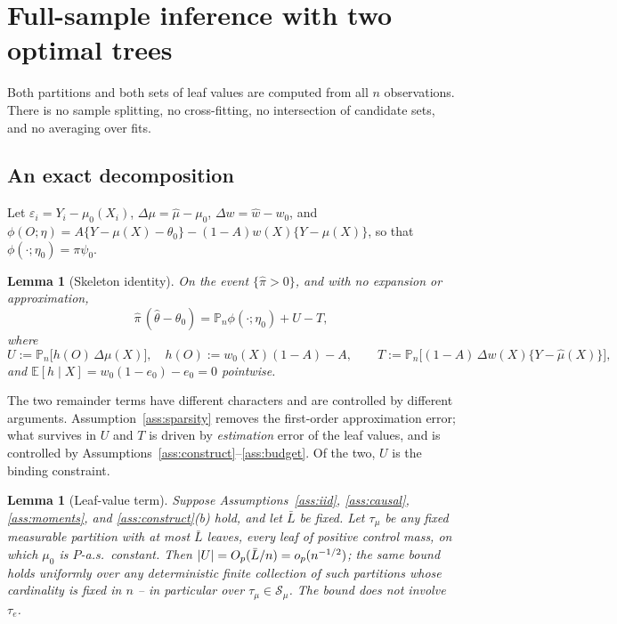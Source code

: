 \documentclass[11pt]{article}
\theoremstyle{plain}
\newtheorem{lemma}[theorem]{Lemma}
\theoremstyle{definition}
\theoremstyle{remark}
\newcommand{\E}{\mathbb{E}}
\newcommand{\Pn}{\mathbb{P}_n}
\newcommand{\cS}{\mathcal{S}}
\newcommand{\ez}{e_0}
\newcommand{\mz}{\mu_0}
\newcommand{\wz}{w_0}
\newcommand{\mhat}{\widehat{\mu}}
\newcommand{\what}{\widehat{w}}
\newcommand{\thetahat}{\widehat{\theta}}
\newcommand{\pihat}{\widehat{\pi}}
\DeclarePairedDelimiter{\abs}{\lvert}{\rvert}
\begin{document}
\section{Full-sample inference with two optimal trees}\label{sec:main}

Both partitions and both sets of leaf values are computed from all $n$
observations. There is no sample splitting, no cross-fitting, no intersection of
candidate sets, and no averaging over fits.

\subsection{An exact decomposition}

Let $\varepsilon_i=Y_i-\mz(X_i)$, $\Delta\mu=\mhat-\mz$, $\Delta w=\what-\wz$,
and $\phi(O;\eta)=A\{Y-\mu(X)-\theta_0\}-(1-A)w(X)\{Y-\mu(X)\}$, so that
$\phi(\cdot;\eta_0)=\pi\psi_0$.

\begin{lemma}[Skeleton identity]\label{lem:skeleton}
On the event $\{\pihat>0\}$, and with no expansion or approximation,
\begin{equation}\label{eq:skeleton}
  \pihat\,(\thetahat-\theta_0)=\Pn\phi(\cdot;\eta_0)+U-T,
\end{equation}
where
\[
  U:=\Pn\bigl[h(O)\,\Delta\mu(X)\bigr],\quad
  h(O):=\wz(X)(1-A)-A,
  \qquad
  T:=\Pn\bigl[(1-A)\,\Delta w(X)\{Y-\mhat(X)\}\bigr],
\]
and $\E[h\mid X]=\wz(1-\ez)-\ez=0$ pointwise.
\end{lemma}

The two remainder terms have different characters and are controlled by
different arguments. Assumption~\ref{ass:sparsity} removes the first-order
approximation error; what survives in $U$ and $T$ is driven by
\emph{estimation} error of the leaf values, and is controlled by
Assumptions~\ref{ass:construct}--\ref{ass:budget}. Of the two, $U$ is the
binding constraint.

\begin{lemma}[Leaf-value term]\label{lem:U}
Suppose Assumptions~\ref{ass:iid}, \ref{ass:causal}, \ref{ass:moments}, and
\ref{ass:construct}(b) hold, and let $\bar L$ be fixed. Let $\tau_\mu$ be any
fixed measurable partition with at most $\bar L$ leaves, every leaf of
positive control mass, on which $\mz$ is $P$-a.s.\ constant. Then
$\abs U=O_p(\bar L/n)=o_p(n^{-1/2})$; the same bound holds uniformly over any
deterministic finite collection of such partitions whose cardinality is
fixed in $n$ -- in particular over $\tau_\mu\in\cS_\mu$. The bound does not
involve $\tau_e$.
\end{lemma}
\end{document}
